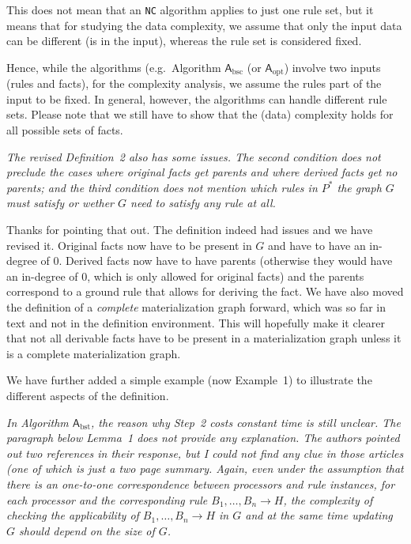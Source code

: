 \documentclass{article}
\let\quoteOld\quote
\let\endquoteOld\endquote
\renewenvironment{quote}{\quoteOld\itshape}{\endquoteOld}
\begin{document}
This does not mean that an \texttt{NC} algorithm applies to just one
rule set, but it means that for studying the data complexity, we
assume that only the input data can be different (is in the input),
whereas the rule set is considered fixed.

Hence, while the algorithms (e.g.\ Algorithm $\mathsf{A}_\text{bsc}$
(or $\mathsf{A}_\text{opt}$) involve two inputs (rules and facts),
for the complexity analysis, we assume the rules part of the input to
be fixed. In general, however, the algorithms can handle different
rule sets. Please note that we still have to show that the (data)
complexity holds for all possible sets of facts.

\begin{quote}
  The revised Definition~2 also has some issues. The second condition
  does not preclude the cases where original facts get parents and
  where derived facts get no parents; and the third condition does not
  mention which rules in $P^*$ the graph $G$ must satisfy or wether
  $G$ need to satisfy any rule at all.
\end{quote}

Thanks for pointing that out. The definition indeed had issues and we
have revised it. Original facts now have to be present in $G$ and have
to have an in-degree of $0$. Derived facts now have to have parents
(otherwise they would have an in-degree of $0$, which is only allowed
for original facts) and the parents correspond to a ground rule that
allows for deriving the fact. We have also moved the definition of a
\emph{complete} materialization graph forward, which was so far in
text and not in the definition environment. This will hopefully make
it clearer that not all derivable facts have to be present in a
materialization graph unless it is a complete materialization graph.

We have further added a simple example (now Example~1) to illustrate
the different aspects of the definition.

\begin{quote}
  In Algorithm $\mathsf{A}_\text{bst}$, the reason why Step~2 costs
  constant time is still unclear. The paragraph below Lemma~1 does not
  provide any explanation. The authors pointed out two references in
  their response, but I could not find any clue in those articles (one
  of which is just a two page summary. Again, even under the assumption that there is an
  one-to-one correspondence between processors and rule instances, for
  each processor and the corresponding rule $B_1, \ldots, B_n \to H$,
  the complexity of checking the applicability of
  $B_1, \ldots, B_n \to H$ in $G$ and at the same time updating $G$
  should depend on the size of $G$.
\end{quote}
\end{document}
